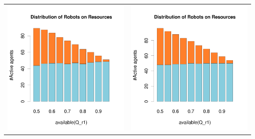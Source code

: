\documentclass[a4paper,10pt]{article}
\begin{document}
\begin{table}[ht]
\begin{tabular}{cc}
 \newline
 \includegraphics[width=\imgSize]{images/5StaticEnv/barplotAliveR1AndR2_mean_env2}& \includegraphics[width=\imgSize]{images/5StaticEnv/barplotAliveR1AndR2_median_env2}
\end{tabular}
\end{table}
\end{document}
